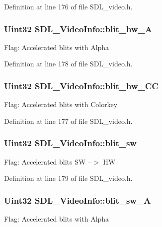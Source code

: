 Definition at line 176 of file S\+D\+L\+\_\+video.\+h.

\hypertarget{structSDL__VideoInfo_a2153563e63065ba5a66836ad03f0cd68}{
\subsubsection[{blit\+\_\+hw\+\_\+\+A}]{\setlength{\rightskip}{0pt plus 5cm}Uint32 S\+D\+L\+\_\+\+Video\+Info\+::blit\+\_\+hw\+\_\+\+A}}\label{structSDL__VideoInfo_a2153563e63065ba5a66836ad03f0cd68}
Flag\+: Accelerated blits with Alpha 

Definition at line 178 of file S\+D\+L\+\_\+video.\+h.

\hypertarget{structSDL__VideoInfo_af62ba97a72e925000dde2ea27c854b7f}{
\subsubsection[{blit\+\_\+hw\+\_\+\+C\+C}]{\setlength{\rightskip}{0pt plus 5cm}Uint32 S\+D\+L\+\_\+\+Video\+Info\+::blit\+\_\+hw\+\_\+\+C\+C}}\label{structSDL__VideoInfo_af62ba97a72e925000dde2ea27c854b7f}
Flag\+: Accelerated blits with Colorkey 

Definition at line 177 of file S\+D\+L\+\_\+video.\+h.

\hypertarget{structSDL__VideoInfo_aa7dc499b5b1bea4bdb4de04bd58fc796}{
\subsubsection[{blit\+\_\+sw}]{\setlength{\rightskip}{0pt plus 5cm}Uint32 S\+D\+L\+\_\+\+Video\+Info\+::blit\+\_\+sw}}\label{structSDL__VideoInfo_aa7dc499b5b1bea4bdb4de04bd58fc796}
Flag\+: Accelerated blits S\+W --$>$ H\+W 

Definition at line 179 of file S\+D\+L\+\_\+video.\+h.

\hypertarget{structSDL__VideoInfo_ad8319697999a5d00f551e2b7547f17aa}{
\subsubsection[{blit\+\_\+sw\+\_\+\+A}]{\setlength{\rightskip}{0pt plus 5cm}Uint32 S\+D\+L\+\_\+\+Video\+Info\+::blit\+\_\+sw\+\_\+\+A}}\label{structSDL__VideoInfo_ad8319697999a5d00f551e2b7547f17aa}
Flag\+: Accelerated blits with Alpha 

